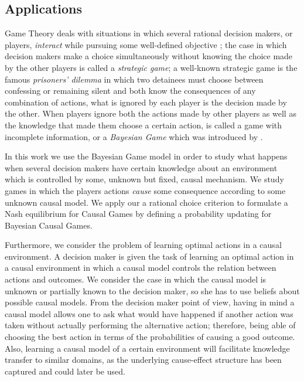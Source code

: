 \documentclass{svjour3}                     %
\begin{document}
\subsection{Applications}
Game Theory deals with situations in which several rational decision makers, or players, \textit{interact} while pursuing some well-defined objective \citep{osborne1994course}; the case in which decision makers make a choice simultaneously without knowing the choice made by the other players is called a \textit{strategic game}; a well-known strategic game is the famous \textit{prisoners' dilemma} in which two detainees must choose between confessing or remaining silent and both know the consequences of any combination of actions, what is ignored by each player is the decision made by the other. When players ignore both the actions made by other players as well as the knowledge that made them choose a certain action, is called a game with incomplete information, or a \textit{Bayesian Game} which was introduced by \cite{harsanyi1967games1,harsanyi1968games2,harsanyi1968games3}. 

In this work we use the Bayesian Game model in order to study what happens when several decision makers have certain knowledge about an environment which is controlled by some, unknown but fixed, causal mechanism. We study games in which the players actions \textit{cause} some consequence according to some unknown causal model. We apply our a rational choice criterion to formulate a Nash equilibrium for Causal Games by defining a probability updating for Bayesian Causal Games.

Furthermore, we consider the problem of learning optimal actions in a causal environment. A decision maker is given the task of learning an optimal action in a causal environment in which a causal model controls the relation between actions and outcomes. We consider the case in which the causal model is unknown or partially known to the decision maker, so she has to use beliefs about possible causal models. From the decision maker point of view, having in mind a causal model allows one to ask what would have happened if another action was taken without actually performing the alternative action; therefore, being able of choosing the best action in terms of the probabilities of causing a good outcome.  Also, learning a causal model of a certain environment will facilitate knowledge transfer to similar domains, as the underlying cause-effect structure has been captured and could later be used.


\end{document}

